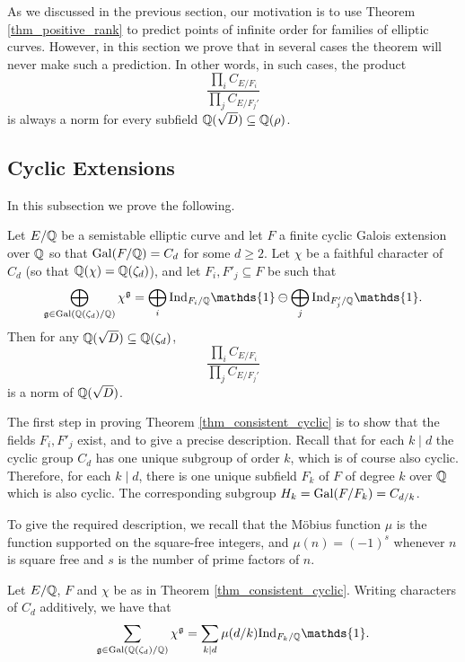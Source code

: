 As we discussed in the previous section, our motivation is to use Theorem \ref*{thm_positive_rank} to predict points of infinite order for families of elliptic curves. However, in this section we prove that in several cases the theorem will never make such a prediction. In other words, in such cases, the product 
$$\frac{\prod_i C_{E/F_i}}{\prod_j C_{E/F_j'}}$$ 
is always a norm for every subfield $\mathbb{Q}(\sqrt{D})\subseteq\mathbb{Q}(\rho)$.

\subsection{Cyclic Extensions}
In this subsection we prove the following. 
\begin{thm}\label{thm_consistent_cyclic}
    Let $E/\mathbb{Q}$ be a semistable elliptic curve and let $F$ a finite cyclic Galois extension over $\mathbb{Q}$ so that $\mathrm{Gal}(F/\mathbb{Q})=C_d$ for some $d\geq 2$. Let $\chi$ be a faithful character of $C_d$ (so that $\mathbb{Q}(\chi)=\mathbb{Q}(\zeta_d)$), and let $F_i,F'_j\subseteq F$ be such that
    $$\bigoplus_{\mathfrak{g}\in\Gal(\QQ(\zeta_d)/\QQ)}\chi^{\mathfrak{g}}=\bigoplus_i\Ind_{F_i/\QQ}\mathds{1}\ominus\bigoplus_j\Ind_{F'_j/\QQ}\mathds{1}.$$
    Then for any $\mathbb{Q}(\sqrt{D})\subseteq\mathbb{Q}(\zeta_d)$,
    $$\frac{\prod_i C_{E/F_i}}{\prod_j C_{E/F_j'}}$$
    is a norm of $\mathbb{Q}(\sqrt{D})$.
\end{thm}

The first step in proving Theorem \ref*{thm_consistent_cyclic} is to show that the fields $F_i, F'_j$ exist, and to give a precise description. Recall that for each $k\mid d$ the cyclic group $C_d$ has one unique subgroup of order $k$, which is of course also cyclic. Therefore, for each $k\mid d$, there is one unique subfield $F_k$ of $F$ of degree $k$ over $\mathbb{Q}$ which is also cyclic. The corresponding subgroup $H_k=\mathrm{Gal}(F/F_k)=C_{d/k}$.

To give the required description, we recall that the Möbius function $\mu$ is the function supported on the square-free integers, and $\mu(n)=(-1)^s$ whenever $n$ is square free and $s$ is the number of prime factors of $n$.

\begin{lemma}
    Let $E/\mathbb{Q}$, $F$ and $\chi$ be as in Theorem \ref*{thm_consistent_cyclic}. Writing characters of $C_d$ additively, we have that
    \begin{equation}
        \sum_{\mathfrak{g}\in\Gal(\QQ(\zeta_d)/\QQ)}\chi^{\mathfrak{g}}=\sum_{k\mid d}\mu(d/k)\Ind_{F_k/\QQ}\mathds{1}.
    \end{equation}
\end{lemma}

